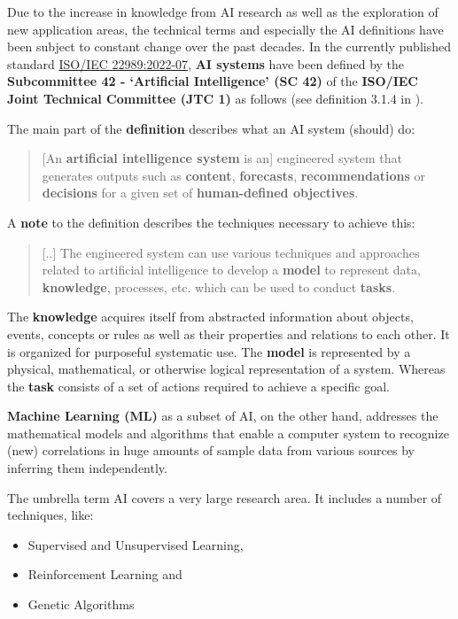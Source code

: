 \documentclass [oneside,10pt,a4paper,ngerman,BCOR10mm,headsepline,parindent,final]{scrartcl}
\providecommand{\tightlist}{%
      \setlength{\itemsep}{0pt}\setlength{\parskip}{0pt}}
\begin{document}
Due to the increase in knowledge from AI research as well as the
exploration of new application areas, the technical terms and especially
the AI definitions have been subject to constant change over the past
decades. In the currently published standard
\href{https://webstore.iec.ch/publication/77839}{ISO/IEC 22989:2022-07},
\textbf{AI systems} have been defined by the \textbf{Subcommittee 42 -
`Artificial Intelligence' (SC 42)} of the \textbf{ISO/IEC Joint
Technical Committee (JTC 1)} as follows (see definition 3.1.4 in
\cite{ISO_IEC_22989_2022-07}).

The main part of the \textbf{definition} describes what an AI system
(should) do:

\begin{quote}
{[}An \textbf{artificial intelligence system} is an{]} engineered system
that generates outputs such as \textbf{content}, \textbf{forecasts},
\textbf{recommendations} or \textbf{decisions} for a given set of
\textbf{human-defined objectives}.
\end{quote}

A \textbf{note} to the definition describes the techniques necessary to
achieve this:

\begin{quote}
{[}..{]} The engineered system can use various techniques and approaches
related to artificial intelligence to develop a \textbf{model} to
represent data, \textbf{knowledge}, processes, etc. which can be used to
conduct \textbf{tasks}.
\end{quote}

The \textbf{knowledge} acquires itself from abstracted information about
objects, events, concepts or rules as well as their properties and
relations to each other. It is organized for purposeful systematic use.
The \textbf{model} is represented by a physical, mathematical, or
otherwise logical representation of a system. Whereas the \textbf{task}
consists of a set of actions required to achieve a specific goal.

\textbf{Machine Learning (ML)} as a subset of AI, on the other hand,
addresses the mathematical models and algorithms that enable a computer
system to recognize (new) correlations in huge amounts of sample data
from various sources by inferring them independently.

The umbrella term AI covers a very large research area. It includes a
number of techniques, like:

\begin{itemize}
\tightlist
\item
  Supervised and Unsupervised Learning,
\item
  Reinforcement Learning and
\item
  Genetic Algorithms
\end{itemize}
\end{document}
